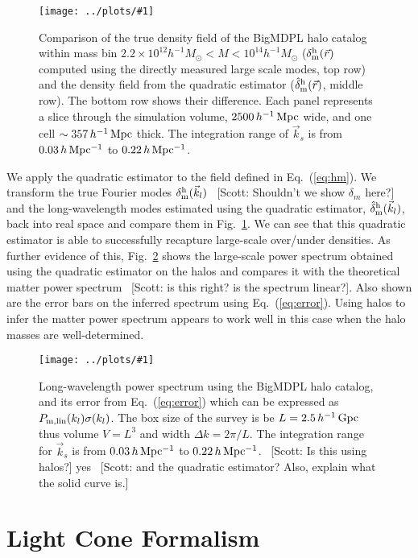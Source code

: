 \documentclass[prd,amsmath,amssymb,floatfix,superscriptaddress,nofootinbib,twocolumn]{revtex4-1}
\newcommand{\vrr}{\vec{r}}
\newcommand{\vk}{\vec{k}}
\newcommand{\ec}[1]{Eq.~(\ref{eq:#1})}
\newcommand{\rf}[1]{\ref{fig:#1}}
\newcommand{\sfig}[2]{
\texttt{[image: ../plots/\#1]}
        }
\newcommand{\Sfig}[2]{
   \begin{figure}[thbp]
   \begin{center}
    \sfig{../plots/#1.pdf}{\columnwidth}
    \caption{{\small #2}}
    \label{fig:#1}
     \end{center}
   \end{figure}
}
\newcommand{\scott}[1]{{\color{darkgreen} \, [Scott: #1]}}
\newcommand{\peikai}[1]{{\color{blue} #1}}
\newcommand\dmh{\delta_{\rm m}^{\rm h}}
\newcommand\hdmh{\hat{\delta}_{\rm m}^{\rm h}}
\begin{document}
\Sfig{real_snap}{Comparison of the true density field of the BigMDPL halo catalog within mass bin $2.2 \times 10^{12}h^{-1}M_{\odot}<M < 10^{14}h^{-1}M_{\odot}$ ($\dmh(\vrr)$ computed using the directly measured large scale modes, top row) and the density field from the quadratic estimator ($\hdmh(\vrr)$, middle row). The bottom row shows their difference. Each panel represents a slice through the simulation volume, $2500\,h^{-1}\rm \, Mpc$ wide, and one cell $\sim 357\,h^{-1}\rm \, Mpc$ thick. The integration range of $\vk_{s}$ is from $0.03\, h \rm \, Mpc^{-1}$ to $0.22\, h \rm \, Mpc^{-1}$.}

We apply the quadratic estimator to the field defined in \ec{hm}. We transform the true Fourier modes $\dmh(\vk_l)$ \scott{Shouldn't we show $\delta_m$ here?} and the long-wavelength modes estimated using the quadratic estimator, $\hdmh(\vk_l)$, back into real space and compare them in Fig.~\rf{real_snap}. We can see that this quadratic estimator is able to successfully recapture large-scale over/under densities. 
As further evidence of this, 
Fig.~\rf{SN_BIGMDPL} shows the large-scale power spectrum obtained using the quadratic estimator on the halos and compares it with the theoretical matter power spectrum \scott{is this right? is the spectrum linear?}. Also shown are the error bars on the inferred spectrum using \ec{error}. Using halos to infer the matter power spectrum appears to work well in this case when the halo masses are well-determined.




\Sfig{SN_BIGMDPL}{Long-wavelength power spectrum using the BigMDPL halo catalog, and its error from \ec{error} which can be expressed as $P_{\rm m, lin}(k_l)\sigma(k_l)$. The box size of the survey is be $L=2.5\, h^{-1}\rm\, Gpc$ thus volume $V=L^3$ and width $\Delta k = 2\pi/L$. The integration range for $\vk_s$ is from $0.03 \,h \,\rm Mpc^{-1}$ to $0.22\,h\,\rm Mpc^{-1}$.\scott{Is this using halos?}\peikai{yes} \scott{and the quadratic estimator? Also, explain what the solid curve is.}}

 

\section{Light Cone Formalism} \label{sec4}
\end{document}
